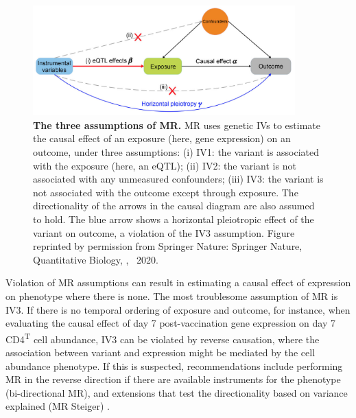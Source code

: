 \begin{figure}
    \centering
    \includegraphics[width=0.9\textwidth,page=1]{mainmatter/figures/chapter_05/zhu2020TranscriptomewideAssociationStudies/Screenshot 2020-11-27 at 22.54.30.png}
    \caption{
        \textbf{The three assumptions of \gls{MR}.} 
        \gls{MR} uses genetic \glspl{IV} to estimate the causal effect \textalpha of an exposure (here, gene expression) on an outcome, under three assumptions:
        (i) IV1: the variant is associated with the exposure (here, an \gls{eQTL});
        (ii) IV2: the variant is not associated with any unmeasured confounders;
        (iii) IV3: the variant is not associated with the outcome except through exposure.
        The directionality of the arrows in the causal diagram are also assumed to hold.
        The blue arrow shows a horizontal pleiotropic effect of the variant on outcome, a violation of the IV3 assumption.
        Figure reprinted by permission from Springer Nature: Springer Nature, Quantitative Biology, \textcite{zhu2020TranscriptomewideAssociationStudies}, \textcopyright~2020.
    }
    \label{fig:discussion_MR_assumptions}
\end{figure}

Violation of \gls{MR} assumptions can result in estimating a causal effect of expression on phenotype where there is none.
The most troublesome assumption of \gls{MR} is IV3.
If there is no temporal ordering of exposure and outcome,
for instance, when evaluating the causal effect of day 7 post-vaccination gene expression on day 7 CD4\textsuperscript T cell abundance,
IV3 can be violated by reverse causation,
where the association between variant and expression might be mediated by the cell abundance phenotype.
If this is suspected, 
recommendations include performing \gls{MR} in the reverse direction if there are available instruments for the phenotype (bi-directional MR),
and extensions that test the directionality based on variance explained (MR Steiger) \autocite{daveysmith2014MendelianRandomizationGenetic,hemani2017OrientingCausalRelationship,hemani2018EvaluatingPotentialRole,neumeyer2020StrengtheningCausalInference}.

